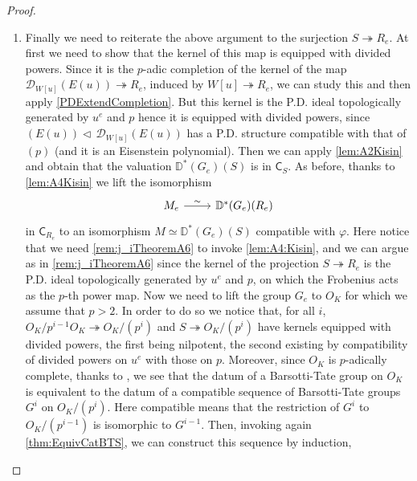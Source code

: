 \begin{proof}
\begin{enumerate}
\item Finally we need to reiterate the above argument to the surjection
	$S \twoheadrightarrow R_e$.
	At first we need to show that the kernel of this map is equipped with divided powers.
	Since it is the $p$-adic completion of the kernel
	of the map $\mathcal{D}_{W[u]}(E(u)) \twoheadrightarrow R_e$,
	induced by $W[u] \twoheadrightarrow R_e$, we can study this and
	then apply \cref{PDExtendCompletion}.
	But this kernel is the P.D. ideal topologically generated 
	by $u^e$ and $p$ hence it is equipped with divided powers,
	since $(E(u)) \triangleleft\, \mathcal{D}_{W[u]}(E(u))$ has a P.D. structure
	compatible with that of $(p)$ (and it is an Eisenstein polynomial).
	Then we can apply \cref{lem:A2Kisin} and obtain that the valuation
	$\mathbb{D}^*(G_e)(S)$ is in $\mathsf{C}_{S}$.
	As before, thanks to \cref{lem:A4Kisin} we lift the isomorphism 
	\begin{equation*}
	\begin{tikzcd}
		M_e \arrow[r, "\sim", rightarrow] &
		\mathbb{D}^*(G_e)(R_e)
	\end{tikzcd}
	\end{equation*}
	in $\mathsf{C}_{R_e}$ to an isomorphism $M \simeq \mathbb{D}^*(G_e)(S)$
	compatible with $\varphi$.
	Here notice that we need \cref{rem:j_iTheoremA6} to invoke
	\cref{lem:A4:Kisin}, and we can argue as in \cref{rem:j_iTheoremA6}
	since the kernel of the projection $S \twoheadrightarrow R_e$ is
	the P.D. ideal topologically generated by $u^e$ and $p$,
	on which the Frobenius acts as the $p$-th power map.
	Now we need to lift the group $G_e$ to $O_K$ for which we assume that $p > 2$.
	In order to do so we notice that, for all $i$,
	$O_K/p^{i-1}O_K \twoheadrightarrow O_K/ (p^i)$ and
	$S \twoheadrightarrow O_K/ (p^i)$ have kernels equipped with
	divided powers, the first being nilpotent, the second existing by compatibility
	of divided powers on $u^e$ with those on $p$.
	Moreover, since $O_K$ is $p$-adically complete, thanks to \cite[Lemma 2.4.4]{deJong},
	we see that the datum of a Barsotti-Tate group on $O_K$ is equivalent to
	the datum of a compatible sequence of Barsotti-Tate groups $G^i$ on $O_K/ (p^i)$.
	Here compatible means that the restriction of $G^i$ to $O_K/ (p^{i-1})$
	is isomorphic to $G^{i-1}$.
	Then, invoking again \cref{thm:EquivCatBTS}, we can construct this sequence by induction,

\end{enumerate}
\end{proof}
